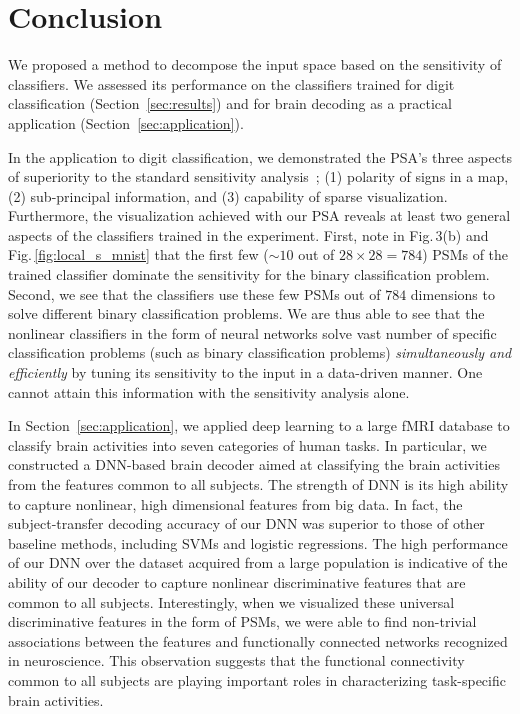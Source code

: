 \section{Conclusion}
\label{sec:discussion}
We proposed a method to decompose the input space based
on the sensitivity of classifiers.
%
We assessed its performance on the classifiers trained for
digit classification (Section~\ref{sec:results}) and for brain
decoding as a practical application (Section~\ref{sec:application}).


In the application to digit classification,
we demonstrated the PSA's three aspects of superiority to the standard sensitivity
analysis~\cite{Zurada1994,Zurada1997,Kjems2002}; (1) polarity of signs in a map, (2)
sub-principal information, and (3) capability of sparse visualization.
Furthermore, the visualization achieved with our PSA reveals
at least two general aspects of the classifiers trained in the experiment.
%
First, note in Fig.\,3(b) and Fig.\,\ref{fig:local_s_mnist} that the first few
($\sim 10$ out of $28 \times 28 = 784$)
PSMs of the trained classifier dominate the sensitivity
for the binary classification problem.
%
Second, we see that the classifiers use these few PSMs out of $784$
dimensions to solve different binary classification problems.
%
We are thus able to see that the nonlinear classifiers in the form of
neural networks solve vast number of specific classification problems
(such as binary classification problems) \textit{simultaneously and efficiently}
by tuning its sensitivity to the input in a data-driven manner.
%
One cannot attain this information with the sensitivity analysis alone.


In Section~\ref{sec:application}, we applied deep learning to a large
fMRI database to classify brain activities into seven categories of
human tasks.
%
In particular, we constructed a DNN-based brain decoder aimed at
classifying the brain activities from the features common to all subjects.
%
The strength of DNN is its high ability to capture nonlinear, high
dimensional features from big data.
%
In fact, the subject-transfer decoding accuracy of our DNN was superior to those of other baseline methods, including SVMs
and logistic regressions.
%
The high performance of our DNN over the dataset acquired from a large population is indicative of the ability of
our decoder to capture nonlinear discriminative features that are common to all subjects.
%
Interestingly, when we visualized these universal discriminative
features in the form of PSMs, we were able to find non-trivial
associations between the features and functionally connected networks
recognized in neuroscience.
%
This observation suggests that the functional connectivity common to all
subjects are playing important roles in characterizing task-specific
brain activities.

